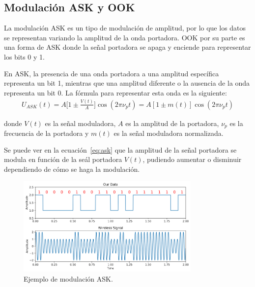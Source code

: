 \documentclass[12pt, letterpaper]{article}
\begin{document}
\subsection{Modulación ASK y OOK}
La modulación ASK es un tipo de modulación de amplitud, por lo que los datos se representan variando la amplitud de la onda portadora. OOK por su parte es una forma de ASK donde la señal portadora se apaga y enciende para representar los bits 0 y 1. 

En ASK, la presencia de una onda portadora a una amplitud específica representa un bit 1, mientras que una amplitud diferente o la ausencia de la onda representa un bit 0. La fórmula para representar esta onda es la siguiente:
\begin{align}
    U_{ASK}(t) = A \Big[1 \pm \frac{V(t)}{A} \Big] \cos(2\pi \nu_p t) = 
    A [1 \pm m(t)] \cos(2\pi \nu_p t) \label{eq:ask}
\end{align}

donde $V(t)$ es la señal moduladora, $A$ es la amplitud de la portadora, $\nu_p$ es la frecuencia de la portadora y $m(t)$ es la señal moduladora normalizada.

Se puede ver en la ecuación~\ref{eq:ask} que la amplitud de la señal portadora se modula en función de la seál portadora $V(t)$, pudiendo aumentar o disminuir dependiendo de cómo se haga la modulación.

\begin{figure}[h]
    \centering
    \includegraphics[width=9cm]{images/ASK.png}
    \caption{Ejemplo de modulación ASK.}
    \label{fig:ask}
\end{figure}
\end{document}
